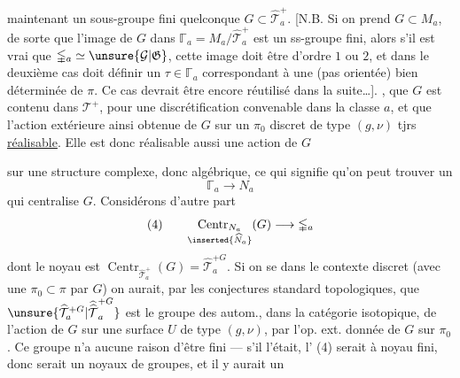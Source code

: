  maintenant un sous-groupe fini quelconque $G\subset\widehat{\mathcal T}_a^+$. [N.B. Si on prend  $G\subset M_a$, de sorte que l'image de $G$ dans $\mathbb{\Gamma}_a=M_a/\widehat{\mathcal T}_a^+$ est un ss-groupe fini, alors s'il  est vrai que $\mathbb{\Gamma}_a\simeq\unsure{\mathcal G|\mathfrak G}$,  cette image doit être d'ordre $1$ ou $2$, et dans le deuxième cas doit  définir un $\tau\in\mathbb{\Gamma}_a$ correspondant à une \uline{} (pas orientée) bien déterminée de $\pi$. Ce cas devrait être encore réutilisé dans la suite\ldots].   , que $G$ est contenu dans $\mathcal T^+$,  pour une discrétification convenable dans la classe $a$, et que l'action extérieure ainsi obtenue de $G$ sur un $\pi_0$ discret de type $(g,\nu)$  tjrs \uline{réalisable}. Elle est donc réalisable aussi  une action de $G$


sur une structure complexe, donc algébrique, ce qui signifie qu'on peut trouver un  
\[
\mathbb{\Gamma}_a\longrightarrow N_a
\]
qui centralise $G$. Considérons d'autre part
\[
(4)\qquad
\underset{\inserted{\widehat N_a}}{\operatorname{Centr}_{N_a}}(G)
\longrightarrow\mathbb{\Gamma}_a
\]
dont le noyau est $\operatorname{Centr}_{\widehat{\mathcal T}_a^+}(G)=\widehat{\mathcal T}_a^{+G}$.
Si on se  dans le contexte discret  (avec une  $\pi_0\subset\pi$  par $G$) on aurait, par les conjectures standard topologiques, que $\unsure{\widehat{\mathcal T}_a^{+G}|\widehat{\widehat{\mathcal T}}_a^{+G}}$ est le groupe des autom., dans la catégorie isotopique, de l'action de $G$ sur une surface $U$ de type $(g,\nu)$,  par l'op. ext. donnée de $G$ sur $\pi_0$. Ce groupe n'a aucune raison d'être fini --- s'il l'était, l' (4) serait à noyau fini, donc serait un   noyaux de groupes, et il y aurait un

